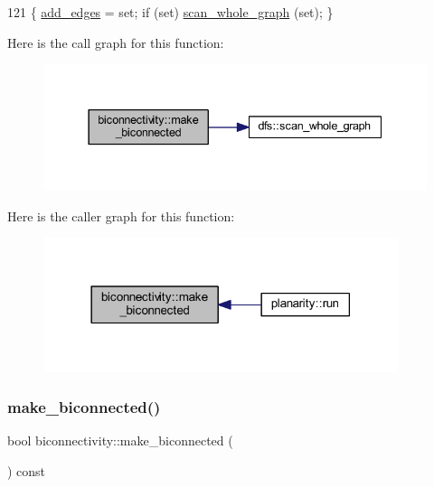 \begin{DoxyCode}
121     \{ \mbox{\hyperlink{classbiconnectivity_a70c1310b4ba83dbe10594f3a33f94763}{add\_edges}} = \textcolor{keyword}{set}; \textcolor{keywordflow}{if} (\textcolor{keyword}{set}) \mbox{\hyperlink{classdfs_a025ed2d6101a7b9f72578a52b484ef50}{scan\_whole\_graph}} (\textcolor{keyword}{set}); \}
\end{DoxyCode}
Here is the call graph for this function\+:\nopagebreak
\begin{figure}[H]
\begin{center}
\leavevmode
\includegraphics[width=337pt]{classbiconnectivity_a774fd08203a6d164605afc4cdc8b9201_cgraph}
\end{center}
\end{figure}
Here is the caller graph for this function\+:\nopagebreak
\begin{figure}[H]
\begin{center}
\leavevmode
\includegraphics[width=294pt]{classbiconnectivity_a774fd08203a6d164605afc4cdc8b9201_icgraph}
\end{center}
\end{figure}
\mbox{\label{classbiconnectivity_a9ca9632a7fc398edb5b505dd0fe706c9}} 
\subsubsection{\texorpdfstring{make\+\_\+biconnected()}{make\_biconnected()}\hspace{0.1cm}{\footnotesize\ttfamily [2/2]}}
{\footnotesize\ttfamily bool biconnectivity\+::make\+\_\+biconnected (\begin{DoxyParamCaption}{ }\end{DoxyParamCaption}) const\hspace{0.3cm}{\ttfamily [inline]}}



